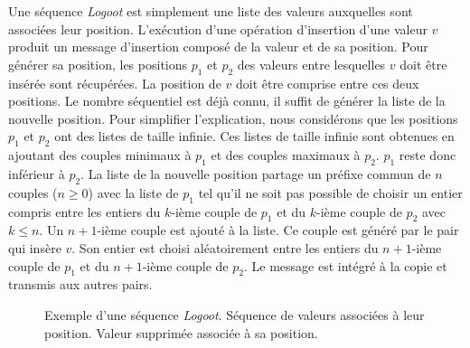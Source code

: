 Une séquence \emph{Logoot} est simplement une liste des valeurs auxquelles sont associées leur position.
L'exécution d'une opération d'insertion d'une valeur $v$ produit un message d'insertion composé de la valeur et de sa position.
Pour générer sa position, les positions $p_1$ et $p_2$ des valeurs entre lesquelles $v$ doit être insérée sont récupérées.
La position de $v$ doit être comprise entre ces deux positions.
Le nombre séquentiel est déjà connu, il suffit de générer la liste de la nouvelle position.
Pour simplifier l'explication, nous considérons que les positions $p_1$ et $p_2$ ont des listes de taille infinie.
Ces listes de taille infinie sont obtenues en ajoutant des couples minimaux à $p_1$ et des couples maximaux à $p_2$.
$p_1$ reste donc inférieur à $p_2$.
La liste de la nouvelle position partage un préfixe commun de $n$ couples ($n \geq 0$) avec la liste de $p_1$ tel qu'il ne soit pas possible de choisir un entier compris entre les entiers du $k$-ième couple de $p_1$ et du $k$-ième couple de $p_2$ avec $k \leq n$.
Un $n+1$-ième couple est ajouté à la liste.
Ce couple est généré par le pair qui insère $v$.
Son entier est choisi aléatoirement entre les entiers du $n+1$-ième couple de $p_1$ et du $n+1$-ième couple de $p_2$.
Le message est intégré à la copie et transmis aux autres pairs.

\begin{figure}[tb]
\centering
\begin{subfigure}[b]{0.69\linewidth}
    \centering
    \caption{}\label{fig:logoot-1}
\end{subfigure}
\begin{subfigure}[b]{0.29\linewidth}
    \centering
    \caption{}\label{fig:logoot-2}
\end{subfigure}
\caption[Séquence \emph{Logoot}]{Exemple d'une séquence \emph{Logoot}.
 Séquence de valeurs associées à leur position.
 Valeur supprimée associée à sa position.}\label{fig:logoot}
\end{figure}

